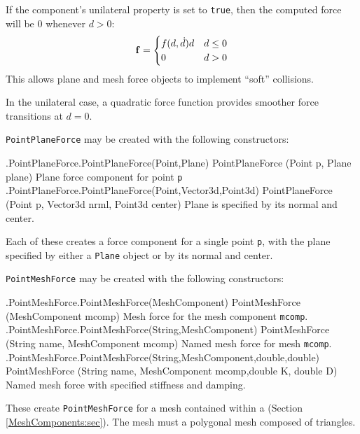 If the component's {\sf unilateral} property is set to {\tt true}, then the
computed force will be 0 whenever $d > 0$:
%
\begin{equation*}
{\bf f} = 
\begin{cases}
f (d, \dot d) d & d \le 0 \\
0 & d > 0
\end{cases}
\end{equation*}
%
This allows plane and mesh force objects to implement ``soft'' collisions.

\begin{sideblock}
In the unilateral case, a quadratic force function provides smoother force
transitions at $d = 0$.
\end{sideblock}

{\tt PointPlaneForce} may be created with the following constructors:
%
\begin{methodtable}{0.6}{0.4}
\midline
%
\methodentry
{\mech.PointPlaneForce.PointPlaneForce(Point,Plane)}%
{PointPlaneForce (Point p, Plane plane)}%
{Plane force component for point {\tt p}}%
%
\methodentry
{\mech.PointPlaneForce.PointPlaneForce(Point,Vector3d,Point3d)}%
{PointPlaneForce (Point p, Vector3d nrml, Point3d center)}%
{Plane is specified by its normal and center.}%
%
\midline
\end{methodtable}
%
Each of these creates a force component for a single point {\tt p}, with the
plane specified by either a {\tt Plane} object or by its normal and center.

{\tt PointMeshForce} may be created with the following constructors:
%
\begin{methodtable}{0.6}{0.4}
\midline
%
\methodentry
{\mech.PointMeshForce.PointMeshForce(MeshComponent)}%
{PointMeshForce (MeshComponent mcomp)}%
{Mesh force for the mesh component {\tt mcomp}.}%
%
\methodentry
{\mech.PointMeshForce.PointMeshForce(String,MeshComponent)}%
{PointMeshForce (String name, MeshComponent mcomp)}%
{Named mesh force for mesh {\tt mcomp}.}%
%
\methodentry
{\mech.PointMeshForce.PointMeshForce(String,MeshComponent,double,double)}%
{PointMeshForce (String name, MeshComponent mcomp,\brh double K, double D)}%
{Named mesh force with specified stiffness and damping.}%
%
\midline
\end{methodtable}
%
These create {\tt PointMeshForce} for a mesh contained within a
 (Section \ref{MeshComponents:sec}).
The mesh must a polygonal mesh composed of triangles.

